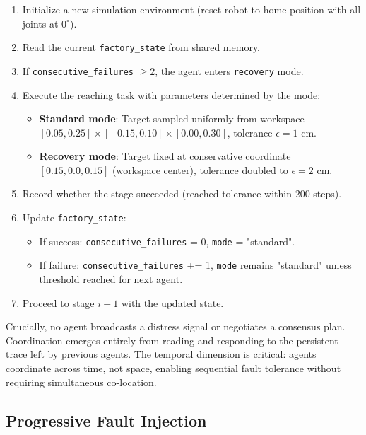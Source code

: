 \documentclass[12pt,a4paper,oneside]{report}
\begin{document}
\begin{enumerate}
    \item Initialize a new simulation environment (reset robot to home position with all joints at $0^\circ$).
    \item Read the current \texttt{factory\_state} from shared memory.
    \item If \texttt{consecutive\_failures} $\geq 2$, the agent enters \texttt{recovery} mode.
    \item Execute the reaching task with parameters determined by the mode:
        \begin{itemize}
            \item \textbf{Standard mode}: Target sampled uniformly from workspace $[0.05, 0.25] \times [-0.15, 0.10] \times [0.00, 0.30]$, tolerance $\epsilon = 1$ cm.
            \item \textbf{Recovery mode}: Target fixed at conservative coordinate $[0.15, 0.0, 0.15]$ (workspace center), tolerance doubled to $\epsilon = 2$ cm.
        \end{itemize}
    \item Record whether the stage succeeded (reached tolerance within 200 steps).
    \item Update \texttt{factory\_state}:
        \begin{itemize}
            \item If success: \texttt{consecutive\_failures} = 0, \texttt{mode} = "standard".
            \item If failure: \texttt{consecutive\_failures} += 1, \texttt{mode} remains "standard" unless threshold reached for next agent.
        \end{itemize}
    \item Proceed to stage $i+1$ with the updated state.
\end{enumerate}

Crucially, no agent broadcasts a distress signal or negotiates a consensus plan. Coordination emerges entirely from reading and responding to the persistent trace left by previous agents. The temporal dimension is critical: agents coordinate across time, not space, enabling sequential fault tolerance without requiring simultaneous co-location.

\subsection{Progressive Fault Injection}
\label{subsec:progressive_fault_injection}
\end{document}
